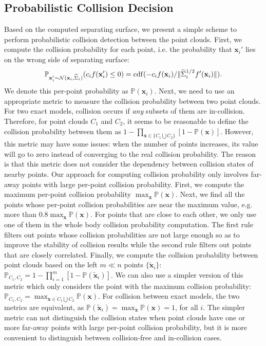\subsection{Probabilistic Collision Decision}
\label{sec:7:algorithm:4}

Based on the computed separating surface, we present a simple scheme to perform probabilistic collision detection between the point clouds.
First, we compute the collision probability for each point, i.e. the probability that $\mathbf x_i'$ lies on the wrong side of separating surface:
\begin{equation}
\label{eq:7:perpointcolprob}
\mathbb{P}_{\mathbf x_i' \sim \mathcal{N}(\mathbf x_i, \widetilde{\Sigma}_i)} (c_i f(\mathbf x_i') \leq 0) =
\erf(-c_i f(\mathbf x_i) / \|\widetilde{\Sigma}_i^{1/2} f'(\mathbf x_i)\|).
\end{equation}
We denote this per-point probability as $\mathbb{P}(\mathbf x_i)$.
Next, we need to use an appropriate metric to measure the collision probability between two point clouds.
For two exact models, collision occurs if \emph{any} subsets of them are in-collision. Therefore, for point clouds $C_1$ and $C_2$, it seems to be reasonable to define the collision probability between them as $1 - \prod_{\mathbf x \in \{C_1 \bigcup C_2\}} [1 - \mathbb{P}(\mathbf x)]$. However, this metric may have some issues: when the number of points increases, its value will go to zero instead of converging to the real collision probability. The reason is that this metric does not consider the dependency between collision states of nearby points.
Our approach for computing collision probability only involves far-away points with large per-point collision probability.
First, we compute the maximum per-point collision probability $\max_{\mathbf x} \mathbb{P}(\mathbf x)$. Next, we find all the points whose per-point collision probabilities are near the maximum value, e.g. more than $0.8 \max_{\mathbf x} \mathbb{P}(\mathbf x)$. For points that are close to each other, we only use one of them in the whole body collision probability computation. The first rule filters out points whose collision probabilities are not large enough so as to improve the stability of collision results while the second rule filters out points that are closely correlated. Finally, we compute the collision probability between point clouds based on the left $m \ll n$ points $\{\tilde{\mathbf x}_i\}$: $\mathbb{P}_{C_1, C_2} = 1 - \prod_{i=1}^m [1 - \mathbb{P}(\tilde{\mathbf x}_i)]$. We can also use a simpler version of this metric which only considers the point with the maximum collision probability: $\mathbb{P}_{C_1, C_2} = \max_{\mathbf x \in C_1 \bigcup C_2} \mathbb{P}(\mathbf x)$. For collision between exact models, the two metrics are equivalent, as $\mathbb{P}(\tilde{\mathbf x}_i) = \max_{\mathbf x} \mathbb{P}(\mathbf x) = 1$,
for all $i$. The simpler metric can not distinguish the collision states when point clouds have one or more
far-away points with large per-point collision probability, but it is more convenient to distinguish between collision-free and in-collision cases.


